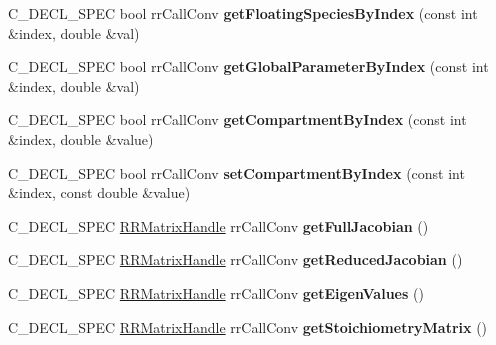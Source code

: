 \begin{DoxyCompactItemize}
\item 
\hypertarget{group__loadsave_gab73fad6a1dfdb2b2d393964354d94c69}{
\-C\-\_\-\-D\-E\-C\-L\-\_\-\-S\-P\-E\-C bool rr\-Call\-Conv {\bfseries get\-Floating\-Species\-By\-Index} (const int \&index, double \&val)}
\label{group__loadsave_gab73fad6a1dfdb2b2d393964354d94c69}

\item 
\hypertarget{group__loadsave_ga1aae76d21a054da6ed6cc734ad10287a}{
\-C\-\_\-\-D\-E\-C\-L\-\_\-\-S\-P\-E\-C bool rr\-Call\-Conv {\bfseries get\-Global\-Parameter\-By\-Index} (const int \&index, double \&val)}
\label{group__loadsave_ga1aae76d21a054da6ed6cc734ad10287a}

\item 
\hypertarget{group__loadsave_ga5241b915cff8bcabba3024c33fb4e336}{
\-C\-\_\-\-D\-E\-C\-L\-\_\-\-S\-P\-E\-C bool rr\-Call\-Conv {\bfseries get\-Compartment\-By\-Index} (const int \&index, double \&value)}
\label{group__loadsave_ga5241b915cff8bcabba3024c33fb4e336}

\item 
\hypertarget{group__loadsave_gadb238a943d93bc9548bf5c3cd452e9bb}{
\-C\-\_\-\-D\-E\-C\-L\-\_\-\-S\-P\-E\-C bool rr\-Call\-Conv {\bfseries set\-Compartment\-By\-Index} (const int \&index, const double \&value)}
\label{group__loadsave_gadb238a943d93bc9548bf5c3cd452e9bb}

\item 
\hypertarget{group__loadsave_ga228e8431e466bf7e5987c1179dcbbbd8}{
\-C\-\_\-\-D\-E\-C\-L\-\_\-\-S\-P\-E\-C \hyperlink{rr__c__types_8h_a87174eefa58ae98dec58c9253ae6c5da}{\-R\-R\-Matrix\-Handle} \*
rr\-Call\-Conv {\bfseries get\-Full\-Jacobian} ()}
\label{group__loadsave_ga228e8431e466bf7e5987c1179dcbbbd8}

\item 
\hypertarget{group__loadsave_ga503c810c1be94e486441eeea88163a18}{
\-C\-\_\-\-D\-E\-C\-L\-\_\-\-S\-P\-E\-C \hyperlink{rr__c__types_8h_a87174eefa58ae98dec58c9253ae6c5da}{\-R\-R\-Matrix\-Handle} \*
rr\-Call\-Conv {\bfseries get\-Reduced\-Jacobian} ()}
\label{group__loadsave_ga503c810c1be94e486441eeea88163a18}

\item 
\hypertarget{group__loadsave_ga7c7c6eb0e77711983254488895f24b81}{
\-C\-\_\-\-D\-E\-C\-L\-\_\-\-S\-P\-E\-C \hyperlink{rr__c__types_8h_a87174eefa58ae98dec58c9253ae6c5da}{\-R\-R\-Matrix\-Handle} \*
rr\-Call\-Conv {\bfseries get\-Eigen\-Values} ()}
\label{group__loadsave_ga7c7c6eb0e77711983254488895f24b81}

\item 
\hypertarget{group__loadsave_gad361175745409d5b6670b8a8996a6d59}{
\-C\-\_\-\-D\-E\-C\-L\-\_\-\-S\-P\-E\-C \hyperlink{rr__c__types_8h_a87174eefa58ae98dec58c9253ae6c5da}{\-R\-R\-Matrix\-Handle} \*
rr\-Call\-Conv {\bfseries get\-Stoichiometry\-Matrix} ()}
\label{group__loadsave_gad361175745409d5b6670b8a8996a6d59}


\end{DoxyCompactItemize}
